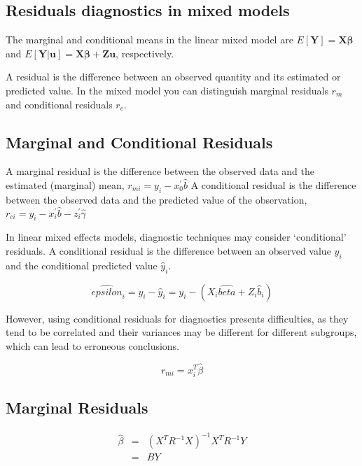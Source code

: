 \documentclass[main.tex]{subfiles}
\begin{document}

\subsection{Residuals diagnostics in mixed models}

The marginal and conditional means in the linear mixed model are
$E[\boldsymbol{Y}] = \boldsymbol{X}\boldsymbol{\beta}$ and
$E[\boldsymbol{Y|\boldsymbol{u}}] = \boldsymbol{X}\boldsymbol{\beta} + \boldsymbol{Z}\boldsymbol{u}$, respectively.

A residual is the difference between an observed quantity and its estimated or predicted value. In the mixed
model you can distinguish marginal residuals $r_m$ and conditional residuals $r_c$. 


\subsection{Marginal and Conditional Residuals}

A marginal residual is the difference between the observed data and the estimated (marginal) mean, $r_{mi} = y_i - x_0^{\prime} \hat{b}$
A conditional residual is the difference between the observed data and the predicted value of the observation,
$r_{ci} = y_i - x_i^{\prime} \hat{b} - z_i^{\prime} \hat{\gamma}$

In linear mixed effects models, diagnostic techniques may consider `conditional' residuals. A conditional residual is the difference between an observed value $y_{i}$ and the conditional predicted value $\hat{y}_{i} $.

\[ \hat{epsilon}_{i} = y_{i} - \hat{y}_{i} = y_{i} - ( X_{i}\hat{beta} + Z_{i}\hat{b}_{i}) \]

However, using conditional residuals for diagnostics presents difficulties, as they tend to be correlated and their variances may be different for different subgroups, which can lead to erroneous conclusions.







\begin{equation}
	r_{mi}=x^{T}_{i}\hat{\beta}
\end{equation}

\subsection{Marginal Residuals}
\begin{eqnarray}
	\hat{\beta} &=& (X^{T}R^{-1}X)^{-1}X^{T}R^{-1}Y \nonumber \\
	&=& BY \nonumber
\end{eqnarray}
\end{document}
